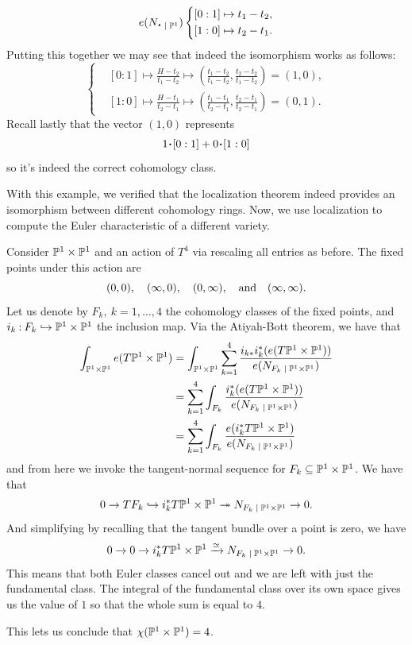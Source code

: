 \documentclass[12pt]{memoir}
\begin{document}
\begin{Ex}
$$e(N_{\.\mid\bP^1})\left\lbrace
\begin{aligned}
    &[0:1]\mapsto t_1-t_2,\\
    &[1:0]\mapsto t_2-t_1.
\end{aligned}
\right.$$
Putting this together we may see that indeed the isomorphism works as follows:
$$\left\lbrace
\begin{aligned}
    &[0:1]\mapsto \frac{H-t_2}{t_1-t_2}\mapsto\left(\frac{t_1-t_2}{t_1-t_2},\frac{t_2-t_2}{t_1-t_2}\right)=(1,0),\\
    &[1:0]\mapsto \frac{H-t_1}{t_2-t_1}\mapsto \left(\frac{t_1-t_1}{t_2-t_1},\frac{t_2-t_1}{t_2-t_1}\right)=(0,1).
\end{aligned}
\right.$$
Recall lastly that the vector $(1,0)$ represents 
$$1\.[0:1]+0\.[1:0]$$
so it's indeed the correct cohomology class.
\end{Ex}

With this example, we verified that the localization theorem indeed provides an isomorphism between different cohomology rings. Now, we use localization to compute the Euler characteristic of a different variety.

\begin{Ex}
    Consider $\mathbb{P}^1\times\mathbb{P}^1$ and an action of $T^4$ via rescaling all entries as before. The fixed points under this action are 
    $$(0,0),\quad(\infty,0),\quad(0,\infty),\quad\text{and}\quad(\infty,\infty).$$
    Let us denote by $F_k,\ k=1,\dots,4$ the cohomology classes of the fixed points, and $i_k\mathbin{:}F_k\hookrightarrow\mathbb{P}^1\times\mathbb{P}^1$ the inclusion map.
    Via the Atiyah-Bott theorem, we have that 
    \begin{align*}
    \int_{\bP^1\x\bP^1}e(T\bP^1\x\bP^1)&=\int_{\bP^1\x\bP^1}\sum_{k=1}^{4}\frac{i_{k\ast} i^\ast_k(e(T\bP^1\x\bP^1))}{e(N_{F_k\mid\bP^1\x\bP^1})}\\
    &=\sum_{k=1}^{4}\int_{F_k}\frac{ i^\ast_k(e(T\bP^1\x\bP^1))}{e(N_{F_k\mid\bP^1\x\bP^1})}\\
    &=\sum_{k=1}^{4}\int_{F_k}\frac{ e(i^\ast_kT\bP^1\x\bP^1)}{e(N_{F_k\mid\bP^1\x\bP^1})}
    \end{align*}
    and from here we invoke the tangent-normal sequence for $F_k\subseteq\mathbb{P}^1\times\mathbb{P}^1$. We have that 
    $$0\to TF_k\hookto i_k^\ast T\bP^1\x\bP^1\onto N_{F_k\mid\bP^1\x\bP^1}\to0.$$
    And simplifying by recalling that the tangent bundle over a point is zero, we have 
    $$0\to0\to i_k^\ast T\bP^1\x\bP^1\xrightarrow[]{\isom} N_{F_k\mid\bP^1\x\bP^1}\to0.$$
    This means that both Euler classes cancel out and we are left with just the fundamental class. The integral of the fundamental class over its own space gives us the value of $1$ so that the whole sum is equal to $4$.\par
    This lets us conclude that $\chi(\mathbb{P}^1\times\mathbb{P}^1)=4$.
\end{Ex}
\end{document}
